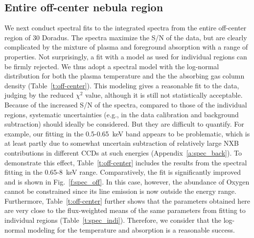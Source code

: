 \documentclass[usenatbib]{mnras}
\def\xs{30 Doradus}
\begin{document}
\subsection{Entire off-center nebula region} 
\label{ss:off-center}
We next conduct spectral fits to the integrated spectra from the entire off-center region of \xs. The spectra maximize the S/N of the data, but are clearly complicated by the mixture of  plasma and foreground absorption with a range of properties. Not surprisingly, a fit with a model as used for individual regions can be firmly rejected.
We thus adopt a spectral model with the log-normal distribution for both the plasma temperature and the the absorbing gas column density (Table~\ref{t:off-center}). This modeling gives a reasonable fit to the data, judging by the reduced $\chi^2$ value, although it is still not statistically acceptable. Because of the increased S/N of the spectra, compared to those of the individual regions, systematic uncertainties (e.g., in the data calibration and background subtraction) should ideally be considered. But they are difficult to quantify. For example, our fitting in the 0.5-0.65~keV band appears to be problematic, which is at least partly due to somewhat uncertain subtraction of relatively large NXB contributions in different CCDs at such energies (Appendix~\ref{a:spec_back}).
To demonstrate this effect, Table~\ref{t:off-center} includes the results from the spectral fitting in the 0.65-8~keV range. Comparatively, the fit is significantly improved and is shown in Fig.~\ref{f:spec_off}. In this case, however, the abundance of Oxygen cannot be constrained since its line emission is now outside the energy range. Furthermore, Table~\ref{t:off-center}  further shows that  the parameters obtained here are very close to the flux-weighted means of the same parameters from fitting to individual regions (Table~\ref{t:spec_indi}). Therefore, we consider that the log-normal modeling for the temperature and absorption is a reasonable success. 
\end{document}
